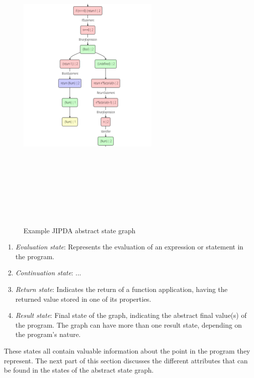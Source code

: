 \begin{figure}[!ht]
    \centering
      \includegraphics[width=262px, height=606px, keepaspectratio]{images/JipdaGraph} 
      \caption{Example JIPDA abstract state graph}
    \label{fig:JipdaGraph}
\end{figure}

\begin{enumerate}
\item \textit{Evaluation state}: Represents the evaluation of an expression or statement in the program.
\item \textit{Continuation state}: ...
\item \textit{Return state}: Indicates the return of a function application, having the returned value stored in one of its properties.
\item \textit{Result state}: Final state of the graph, indicating the abstract final value(s) of the program. The graph can have more than one result state, depending on the program's nature. 
\end{enumerate}

These states all contain valuable information about the point in the program they represent. The next part of this section discusses the different attributes that can be found in the states of the abstract state graph. 


